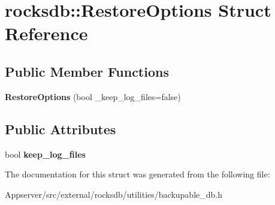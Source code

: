 \hypertarget{structrocksdb_1_1RestoreOptions}{}\section{rocksdb\+:\+:Restore\+Options Struct Reference}
\label{structrocksdb_1_1RestoreOptions}
\subsection*{Public Member Functions}
\begin{DoxyCompactItemize}
\item 
{\bfseries Restore\+Options} (bool \+\_\+keep\+\_\+log\+\_\+files=false)\hypertarget{structrocksdb_1_1RestoreOptions_abaf8129611f7174ab666932162674343}{}\label{structrocksdb_1_1RestoreOptions_abaf8129611f7174ab666932162674343}

\end{DoxyCompactItemize}
\subsection*{Public Attributes}
\begin{DoxyCompactItemize}
\item 
bool {\bfseries keep\+\_\+log\+\_\+files}\hypertarget{structrocksdb_1_1RestoreOptions_a1afaba5beaee9776bea92d5c48e55020}{}\label{structrocksdb_1_1RestoreOptions_a1afaba5beaee9776bea92d5c48e55020}

\end{DoxyCompactItemize}


The documentation for this struct was generated from the following file\+:\begin{DoxyCompactItemize}
\item 
Appserver/src/external/rocksdb/utilities/backupable\+\_\+db.\+h\end{DoxyCompactItemize}
